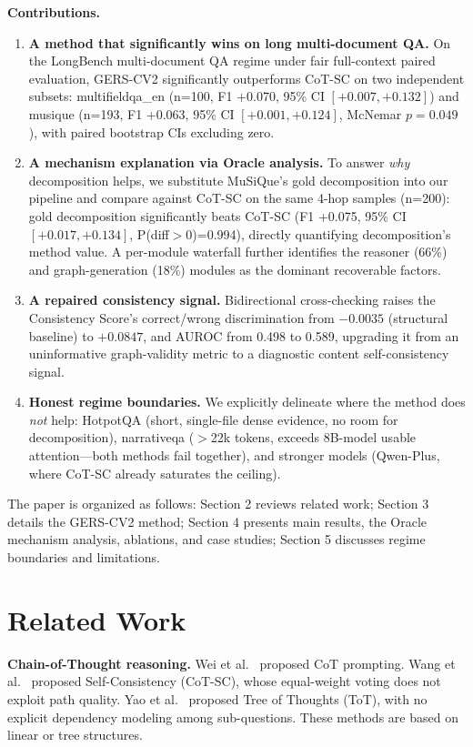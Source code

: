 \documentclass[11pt,a4paper]{article}
\begin{document}
\noindent\textbf{Contributions.}
\begin{enumerate}[label=\arabic*.]
\item \textbf{A method that significantly wins on long multi-document QA.} On the LongBench multi-document QA regime under fair full-context paired evaluation, GERS-CV2 significantly outperforms CoT-SC on two independent subsets: multifieldqa\_en (n=100, F1 +0.070, 95\% CI $[+0.007,+0.132]$) and musique (n=193, F1 +0.063, 95\% CI $[+0.001,+0.124]$, McNemar $p=0.049$), with paired bootstrap CIs excluding zero.
\item \textbf{A mechanism explanation via Oracle analysis.} To answer \emph{why} decomposition helps, we substitute MuSiQue's gold decomposition into our pipeline and compare against CoT-SC on the same 4-hop samples (n=200): gold decomposition significantly beats CoT-SC (F1 +0.075, 95\% CI $[+0.017,+0.134]$, P(diff$>$0)=0.994), directly quantifying decomposition's method value. A per-module waterfall further identifies the reasoner (66\%) and graph-generation (18\%) modules as the dominant recoverable factors.
\item \textbf{A repaired consistency signal.} Bidirectional cross-checking raises the Consistency Score's correct/wrong discrimination from $-0.0035$ (structural baseline) to $+0.0847$, and AUROC from 0.498 to 0.589, upgrading it from an uninformative graph-validity metric to a diagnostic content self-consistency signal.
\item \textbf{Honest regime boundaries.} We explicitly delineate where the method does \emph{not} help: HotpotQA (short, single-file dense evidence, no room for decomposition), narrativeqa (${>}$22k tokens, exceeds 8B-model usable attention---both methods fail together), and stronger models (Qwen-Plus, where CoT-SC already saturates the ceiling).
\end{enumerate}

The paper is organized as follows: Section 2 reviews related work; Section 3 details the GERS-CV2 method; Section 4 presents main results, the Oracle mechanism analysis, ablations, and case studies; Section 5 discusses regime boundaries and limitations.

\section{Related Work}

\noindent\textbf{Chain-of-Thought reasoning.} Wei et al.~\cite{wei2022cot} proposed CoT prompting. Wang et al.~\cite{wang2023sc} proposed Self-Consistency (CoT-SC), whose equal-weight voting does not exploit path quality. Yao et al.~\cite{yao2023tot} proposed Tree of Thoughts (ToT), with no explicit dependency modeling among sub-questions. These methods are based on linear or tree structures.
\end{document}
